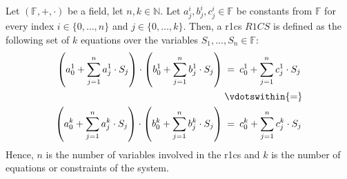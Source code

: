 \begin{definition}
    \label{def:r1cs}
    Let $(\mathbb{F},+,\cdot )$ be a field, let $n,k\in\mathbb{N}$.
    Let $a_j^i,b_j^i,c_j^i\in\mathbb{F}$ be constants from $\mathbb{F}$ for every index $i\in\{0,\dots, n\}$ and $j\in\{0,\dots, k\}$.
    Then, a \gls{r1cs} $R1CS$ is defined as the following set of $k$ equations over the variables $S_1,\dots, S_n\in\mathbb{F}$:
    \begin{align*}
        \left(a_0^1+\sum\limits_{j=1}^n a_j^1\cdot S_j\right)\cdot \left(b_0^1+\sum\limits_{j=1}^n b_j^1\cdot S_j\right) \:&=\: c_0^1+\sum\limits_{j=1}^n c_j^1\cdot S_j\\
        &\vdotswithin{=}\\
        \left(a_0^k+\sum\limits_{j=1}^n a_j^k\cdot S_j\right)\cdot \left(b_0^k+\sum\limits_{j=1}^n b_j^k\cdot S_j\right) \:&=\: c_0^k+\sum\limits_{j=1}^n c_j^k\cdot S_j\\
    \end{align*}
    Hence, $n$ is the number of variables involved in the \gls{r1cs} and $k$ is the number of equations or constraints of the system.
\end{definition}

